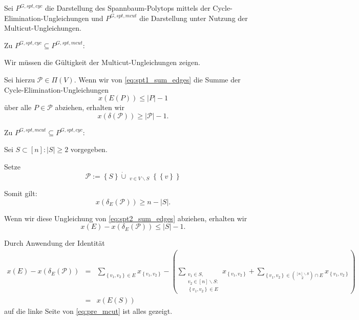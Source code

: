 \documentclass[10p,a4paper,BCOR = 12mm, DIV=15]{scrbook}
\begin{document}
\begin{bew}
Sei $P^{G, spt, cyc}$ die Darstellung des Spannbaum-Polytops mittels der Cycle-Elimination-Ungleichungen und $P^{G, spt, mcut}$ die Darstellung unter Nutzung der Multi\-cut-Ungleichungen.

Zu $P^{G, spt, cyc} \subseteq P^{G, spt, mcut}$:

Wir müssen die Gültigkeit der Multicut-Ungleichungen zeigen.

Sei hierzu $\mathcal{P} \in \Pi\left(V\right)$. Wenn wir von \eqref{eq:spt1_sum_edges} die Summe der Cycle-Elimination-Ungleichungen
\begin{displaymath}
x\left(E\left(P\right)\right) \leq \left|P\right|-1
\end{displaymath}
über alle $P \in \mathcal{P}$ abziehen, erhalten wir
\begin{displaymath}
x\left(\delta\left(\mathcal{P}\right)\right) \geq \left|\mathcal{P}\right|-1.
\end{displaymath}

Zu $P^{G, spt, mcut} \subseteq P^{G, spt, cyc}$:

Sei $S \subset \left[n\right]: \left|S\right| \geq 2$ vorgegeben.

Setze
\begin{displaymath}
\mathcal{P} := \left\{S\right\} \mathbin{\dot{\cup}} \mathop{\dot{\bigcup}}_{v \in V \backslash S} \left\{\left\{v\right\}\right\}
\end{displaymath}

Somit gilt:
\begin{displaymath}
x\left(\delta_E\left(\mathcal{P}\right)\right) \geq n-\left|S\right|.
\end{displaymath}

Wenn wir diese Ungleichung von \eqref{eq:spt2_sum_edges} abziehen, erhalten wir
\begin{equation}
x\left(E\right) - x\left(\delta_E\left(\mathcal{P}\right)\right) \leq \left|S\right| - 1. \label{eq:pre_mcut}
\end{equation}

Durch Anwendung der Identität
\begin{eqnarray*}
x\left(E\right) - x\left(\delta_E\left(\mathcal{P}\right)\right) & = & \sum_{\left\{v_1, v_2\right\} \in E} x_{\left\{v_1, v_2\right\}} - \left(\sum_{\substack{
v_1 \in S, \\
v_2 \in \left[n\right] \backslash S: \\
\left\{v_1, v_2\right\} \in E}} x_{\left\{v_1, v_2\right\}} + \sum_{\left\{v_1, v_2\right\} \in {\left[n\right] \backslash S \choose 2} \cap E} x_{\left\{v_1, v_2\right\}}\right) \\
& = & x\left(E\left(S\right)\right)
\end{eqnarray*}
auf die linke Seite von \eqref{eq:pre_mcut} ist alles gezeigt.
\end{bew}
\end{document}
